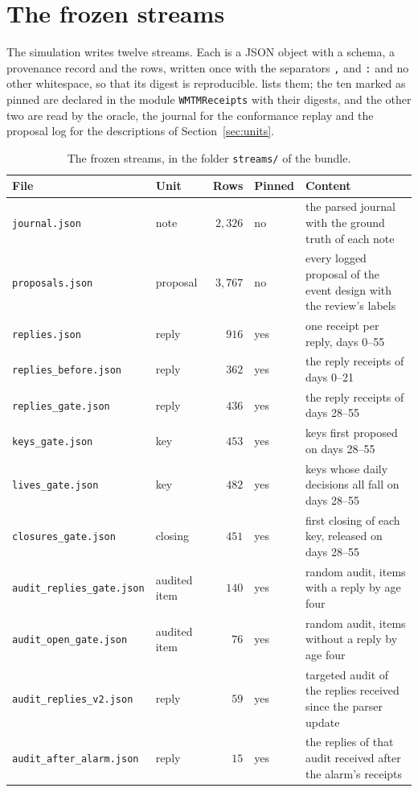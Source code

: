 \documentclass[11pt]{article}
\newcommand{\fpath}[1]{\nolinkurl{#1}}
\newcommand{\code}[1]{\texttt{#1}}
\theoremstyle{definition}
\theoremstyle{plain}
\begin{document}
\section{The frozen streams}\label{app:streams}

The simulation writes twelve streams. Each is a JSON object with a schema, a provenance record and
the rows, written once with the separators \code{,} and \code{:} and no other whitespace, so that
its digest is reproducible.  lists them; the ten marked as pinned are declared in
the module \code{WMTMReceipts} with their digests, and the other two are read by the oracle, the
journal for the conformance replay and the proposal log for the descriptions of
Section~\ref{sec:units}.

\begin{table}[ht]
\centering\small
\begin{tabularx}{\textwidth}{>{\raggedright\arraybackslash}p{4.45cm}>{\raggedright\arraybackslash}p{1.6cm}rl>{\raggedright\arraybackslash}X}
\toprule
File & Unit & Rows & Pinned & Content\\
\midrule
\fpath{journal.json} & note & $2{,}326$ & no & the parsed journal with the ground truth of each note\\
\fpath{proposals.json} & proposal & $3{,}767$ & no & every logged proposal of the event design with the review's labels\\
\fpath{replies.json} & reply & $916$ & yes & one receipt per reply, days 0--55\\
\fpath{replies_before.json} & reply & $362$ & yes & the reply receipts of days 0--21\\
\fpath{replies_gate.json} & reply & $436$ & yes & the reply receipts of days 28--55\\
\fpath{keys_gate.json} & key & $453$ & yes & keys first proposed on days 28--55\\
\fpath{lives_gate.json} & key & $482$ & yes & keys whose daily decisions all fall on days 28--55\\
\fpath{closures_gate.json} & closing & $451$ & yes & first closing of each key, released on days 28--55\\
\fpath{audit_replies_gate.json} & audited item & $140$ & yes & random audit, items with a reply by age four\\
\fpath{audit_open_gate.json} & audited item & $76$ & yes & random audit, items without a reply by age four\\
\fpath{audit_replies_v2.json} & reply & $59$ & yes & targeted audit of the replies received since the parser update\\
\fpath{audit_after_alarm.json} & reply & $15$ & yes & the replies of that audit received after the alarm's receipts\\
\bottomrule
\end{tabularx}
\caption{The frozen streams, in the folder \fpath{streams/} of the bundle.}\label{tab:streams}
\end{table}
\end{document}
